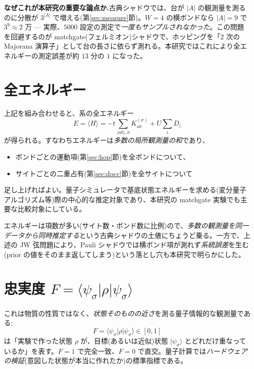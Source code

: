 \documentclass[11pt,a4paper]{ltjsarticle}
\newcommand{\ket}[1]{|#1\rangle}
\newcommand{\ev}[1]{\langle #1\rangle}
\begin{document}
\begin{keybox}
\textbf{なぜこれが本研究の重要な論点か.}古典シャドウでは、台が $|A|$ の観測量を測るのに分散が $3^{|A|}$ で増える(第\ref{sec:measure}節)。$W=4$ の横ボンドなら $|A|=9$ で $3^9\approx2$ 万 — 実際、$5000$ 設定の測定で\emph{一度もサンプルされなかった}。この問題を回避するのが matchgate(フェルミオン)シャドウで、ホッピングを「2 次の Majorana 演算子」として台の長さに依らず測れる。本研究ではこれにより全エネルギーの測定誤差が約 $13$ 分の $1$ になった。
\end{keybox}

\section{全エネルギー}
\label{sec:energy}

上記を組み合わせると、系の全エネルギー
\begin{equation}
  E = \ev{H} = -t\sum_{\langle ab\rangle,\sigma}K_{ab}^{(\sigma)} + U\sum_i D_i
\end{equation}
が得られる。すなわちエネルギーは\emph{多数の局所観測量の和}であり、
\begin{itemize}
  \item ボンドごとの運動項(第\ref{sec:hop}節)を全ボンドについて、
  \item サイトごとの二重占有(第\ref{sec:docc}節)を全サイトについて
\end{itemize}
足し上げればよい。量子シミュレータで基底状態エネルギーを求める(変分量子アルゴリズム等)際の中心的な推定対象であり、本研究の matchgate 実験でも主要な比較対象にしている。

エネルギーは項数が多い(サイト数・ボンド数に比例)ので、\emph{多数の観測量を同一データから同時推定する}という古典シャドウの土俵にちょうど乗る。一方で、上述の JW 弦問題により、Pauli シャドウでは横ボンド項が測れず\emph{系統誤差}を生む(prior の値をそのまま返してしまう)という落とし穴も本研究で明らかにした。

\section{忠実度 $F=\ev{\psi_\sigma|\rho|\psi_\sigma}$}
\label{sec:fidelity}

これは物質の性質ではなく、\emph{状態そのものの近さ}を測る量子情報的な観測量である:
\begin{equation}
  F = \ev{\psi_\sigma|\rho|\psi_\sigma}\in[0,1]
\end{equation}
は「実験で作った状態 $\rho$ が、目標(あるいは近似)状態 $\ket{\psi_\sigma}$ とどれだけ重なっているか」を表す。$F=1$ で完全一致、$F=0$ で直交。量子計算では\emph{ハードウェアの検証}(意図した状態が本当に作れたか)の標準指標である。
\end{document}
